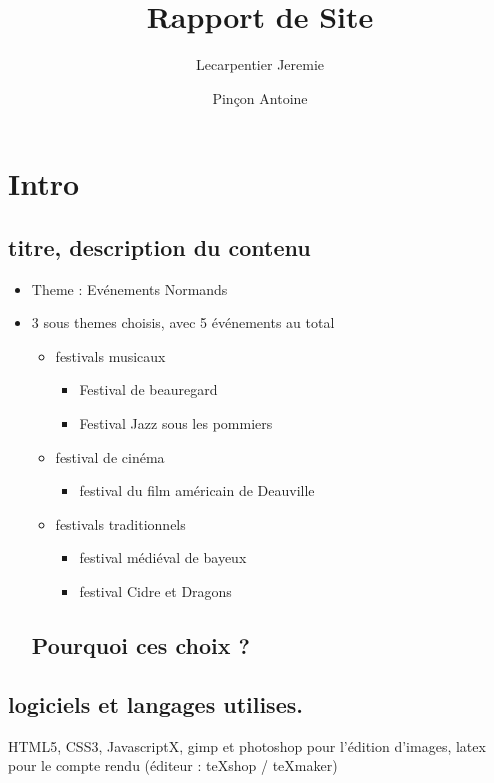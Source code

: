 \documentclass{scrartcl}
\begin{document}
\title{Rapport de Site}
\author{Lecarpentier Jeremie
\and Pinçon Antoine}
\maketitle


\tableofcontents
\listoftables
\listoffigures



\section{Intro}


\subsection{titre, description du contenu}
\begin{itemize}
\item Theme : Evénements Normands
\item 3 sous themes choisis, avec 5 événements au total
\begin{itemize}
\item festivals musicaux

\begin{itemize}
\item Festival de beauregard
\item Festival  Jazz sous les pommiers
\end{itemize}
\item festival de cinéma
\begin{itemize}
\item festival du film américain de Deauville
\end{itemize}
\item festivals traditionnels
\begin{itemize}
\item festival médiéval de bayeux
\item festival Cidre et Dragons
\end{itemize}
\end{itemize}

\subsection{Pourquoi ces choix ?}


\end{itemize}


\subsection{logiciels et langages utilises.}
HTML5, CSS3, JavascriptX, gimp et photoshop pour l'édition d'images, latex pour le compte rendu (éditeur : teXshop / teXmaker)
\end{document}
